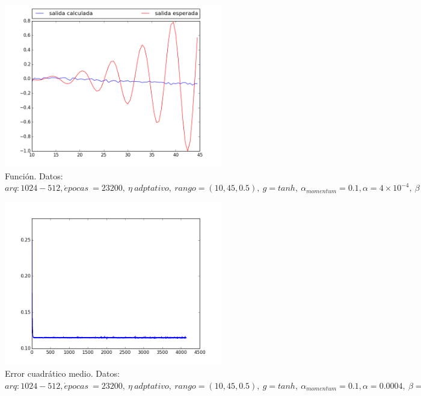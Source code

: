 \documentclass[12pt,a4paper]{article}
\begin{document}
\begin{figure}[H]
\centering
\includegraphics[width=0.85\textwidth]{img/_1024__512_-momentumadaptative-FUNCTION.png}
\caption{\label{fig:test10-45-momentum-adapt-fn} Función. Datos:  $arq: 1024-512, \acute{e} pocas \ = 23200,\ \eta \ adptativo, \ rango=(10, 45, 0.5),\ g=tanh, \ \alpha_{momentum} = 0.1, \alpha = 4 \times 10^{-4}, \ \beta = 0.5, \ E = 1.15 /times 10^{-1}$ }
\end{figure}

\begin{figure}[H]
\centering
\includegraphics[width=0.85\textwidth]{img/_1024__512_-momentumadaptative-ERROR.png}
\caption{\label{fig:test10-45-momentum-adapt-error} Error cuadrático medio. Datos:  $arq: 1024-512, \acute{e} pocas \ = 23200,\ \eta \ adptativo, \ rango=(10, 45, 0.5),\ g=tanh, \ \alpha_{momentum} = 0.1, \alpha = 0.0004, \ \beta = 0.5, \ \beta_{fn \ act} = 1 \ E = 1.15 /times 10^{-1}$ }
\end{figure}
\end{document}
